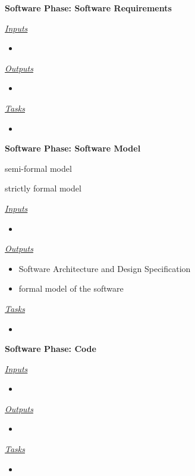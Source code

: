 \documentclass{template/openetcs_article}
\begin{document}
\begin{description}
\item \textbf{Software Phase: Software Requirements}

\underline{\textit{Inputs}}
\begin{itemize}
\item 
\end{itemize}

\underline{\textit{Outputs}}
\begin{itemize}
\item 
\end{itemize}

\underline{\textit{Tasks}}
\begin{itemize}
\item 
\end{itemize}
\end{description}

\begin{description}
\item \textbf{Software Phase: Software Model}
\begin{description}
\item semi-formal model 
\item strictly formal model
\end{description}
\underline{\textit{Inputs}}
\begin{itemize}
\item 
\end{itemize}

\underline{\textit{Outputs}}
\begin{itemize}
\item Software Architecture and Design Specification
\item formal model of the software
\end{itemize}

\underline{\textit{Tasks}}
\begin{itemize}
\item 
\end{itemize}
\end{description}

\begin{description}
\item \textbf{Software Phase: Code}

\underline{\textit{Inputs}}
\begin{itemize}
\item 
\end{itemize}

\underline{\textit{Outputs}}
\begin{itemize}
\item 
\end{itemize}

\underline{\textit{Tasks}}
\begin{itemize}
\item 
\end{itemize}
\end{description}
\end{document}
